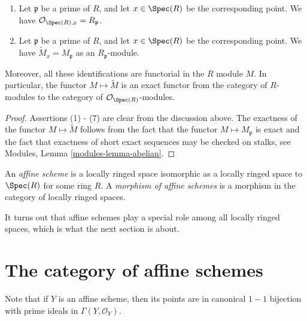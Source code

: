 \begin{lemma}
\begin{enumerate}
are the maps
$R_f \to R_g$ and $M_f \to M_g$ from Lemma
\ref{lemma-standard-open}.
\item Let $\mathfrak p$ be a prime of $R$, and let $x \in \Spec(R)$
be the corresponding point. We have
$\mathcal{O}_{\Spec(R), x} = R_{\mathfrak p}$.
\item Let $\mathfrak p$ be a prime of $R$, and let $x \in \Spec(R)$
be the corresponding point. We have $\widetilde M_x = M_{\mathfrak p}$
as an $R_{\mathfrak p}$-module.
\end{enumerate}
Moreover, all these identifications are functorial in the $R$
module $M$. In particular, the functor $M \mapsto \widetilde M$
is an exact functor from the category of $R$-modules
to the category of $\mathcal{O}_{\Spec(R)}$-modules.
\end{lemma}

\begin{proof}
Assertions (1) - (7) are clear from the discussion above.
The exactness of the functor $M \mapsto \widetilde M$
follows from the fact that the functor $M \mapsto M_{\mathfrak p}$
is exact and the fact that exactness of short exact sequences
may be checked on stalks, see
Modules, Lemma \ref{modules-lemma-abelian}.
\end{proof}

\begin{definition}
\label{definition-affine-scheme}
An {\it affine scheme} is a locally ringed space isomorphic
as a locally ringed space to $\Spec(R)$ for some ring $R$.
A {\it morphism of affine schemes} is a morphism in the category
of locally ringed spaces.
\end{definition}

\noindent
It turns out that affine schemes play a special role
among all locally ringed spaces, which is what the next
section is about.


















\section{The category of affine schemes}
\label{section-category-affine-schemes}

\noindent
Note that if $Y$ is an affine scheme, then its
points are in canonical $1-1$ bijection with
prime ideals in $\Gamma(Y, \mathcal{O}_Y)$.

